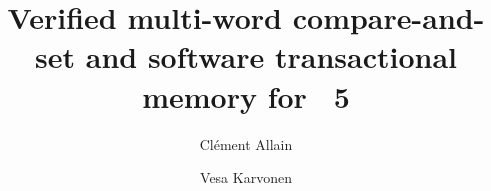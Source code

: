 \documentclass[acmsmall,screen,review,anonymous,nonacm]{acmart}
\begin{document}

\title{Verified multi-word compare-and-set and software transactional memory for \OCaml~5}

\author{Clément Allain}

\author{Vesa Karvonen}

\begin{abstract}
  
\end{abstract}

\maketitle

















\clearpage


\end{document}
